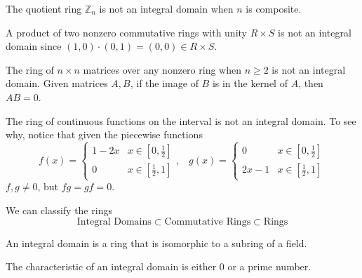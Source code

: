       \begin{example}
        The quotient ring $\mathbb{Z}_n$ is not an integral domain when $n$ is composite. 
      \end{example}

      \begin{example}
        A product of two nonzero commutative rings with unity $R \times S$ is not an integral domain since $(1,0) \cdot (0, 1) = (0, 0) \in R \times S$. 
      \end{example}

      \begin{example}
        The ring of $n \times n$ matrices over any nonzero ring when $ n \geq 2$ is not an integral domain. Given matrices $A, B$, if the image of $B$ is in the kernel of $A$, then $A B = 0$.
      \end{example}

      \begin{example}
        The ring of continuous functions on the interval is not an integral domain. To see why, notice that given the piecewise functions 
        \begin{equation}
          f (x) = \begin{cases}
          1 - 2x & x \in [0, \frac{1}{2}] \\
          0 & x \in [\frac{1}{2}, 1] 
          \end{cases}, \; \;\;g (x) = \begin{cases}
          0 & x \in [0, \frac{1}{2}] \\
          2x - 1 & x \in [\frac{1}{2}, 1] 
          \end{cases}
        \end{equation}
        $f, g \neq 0$, but $f g = g f = 0$. 
      \end{example}

      We can classify the rings
      \begin{equation}
        \text{Integral Domains} \subset \text{Commutative Rings} \subset \text{Rings}
      \end{equation}

      \begin{proposition}
        An integral domain is a ring that is isomorphic to a subring of a field. 
      \end{proposition}

      \begin{proposition}
        The characteristic of an integral domain is either $0$ or a prime number. 
      \end{proposition}


